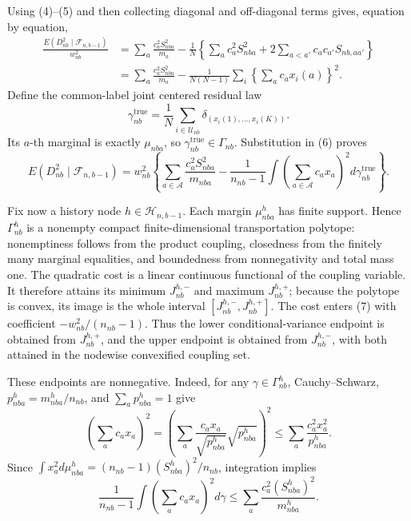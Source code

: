 Using (4)--(5) and then collecting diagonal and off-diagonal terms gives, equation by equation,
\[
\begin{aligned}
\frac{E(D_{nb}^2\mid\mathcal F_{n,b-1})}{w_{nb}^2}
&=\sum_a\frac{c_a^2S_{nba}^2}{m_a}
-\frac1N\left\{\sum_a c_a^2S_{nba}^2
+2\sum_{a<a'}c_ac_{a'}S_{nb,aa'}\right\}\\
&=\sum_a\frac{c_a^2S_{nba}^2}{m_a}
-\frac1{N(N-1)}\sum_i\left\{\sum_a c_ax_i(a)\right\}^2.
\end{aligned}
\tag{6}
\]
Define the common-label joint centered residual law
\[
\gamma_{nb}^{\mathrm{true}}
=\frac1N\sum_{i\in\mathcal U_{nb}}
\delta_{(x_i(1),\ldots,x_i(K))}.
\]
Its \(a\)-th marginal is exactly \(\mu_{nba}\), so \(\gamma_{nb}^{\mathrm{true}}\in\Gamma_{nb}\). Substitution in (6) proves
\[
E(D_{nb}^2\mid\mathcal F_{n,b-1})
=w_{nb}^2\left\{\sum_{a\in\mathcal A}\frac{c_a^2S_{nba}^2}{m_{nba}}
-\frac1{n_{nb}-1}\int\left(\sum_{a\in\mathcal A}c_ax_a\right)^2
d\gamma_{nb}^{\mathrm{true}}\right\}.
\tag{7}
\]

Fix now a history node \(h\in\mathcal H_{n,b-1}\). Each margin \(\mu_{nba}^h\) has finite support. Hence \(\Gamma_{nb}^h\) is a nonempty compact finite-dimensional transportation polytope: nonemptiness follows from the product coupling, closedness from the finitely many marginal equalities, and boundedness from nonnegativity and total mass one. The quadratic cost is a linear continuous functional of the coupling variable. It therefore attains its minimum \(J_{nb}^{h,-}\) and maximum \(J_{nb}^{h,+}\); because the polytope is convex, its image is the whole interval \([J_{nb}^{h,-},J_{nb}^{h,+}]\). The cost enters (7) with coefficient \(-w_{nb}^2/(n_{nb}-1)\). Thus the lower conditional-variance endpoint is obtained from \(J_{nb}^{h,+}\), and the upper endpoint is obtained from \(J_{nb}^{h,-}\), with both attained in the nodewise convexified coupling set.

These endpoints are nonnegative. Indeed, for any \(\gamma\in\Gamma_{nb}^h\), Cauchy--Schwarz, \(p_{nba}^h=m_{nba}^h/n_{nb}\), and \(\sum_ap_{nba}^h=1\) give
\[
\left(\sum_ac_ax_a\right)^2
=\left(\sum_a\frac{c_ax_a}{\sqrt{p_{nba}^h}}\sqrt{p_{nba}^h}\right)^2
\le\sum_a\frac{c_a^2x_a^2}{p_{nba}^h}.
\]
Since
\(\int x_a^2d\mu_{nba}^h=(n_{nb}-1)(S_{nba}^h)^2/n_{nb}\), integration implies
\[
\frac1{n_{nb}-1}\int\left(\sum_ac_ax_a\right)^2d\gamma
\le\sum_a\frac{c_a^2(S_{nba}^h)^2}{m_{nba}^h}.
\tag{8}
\]

